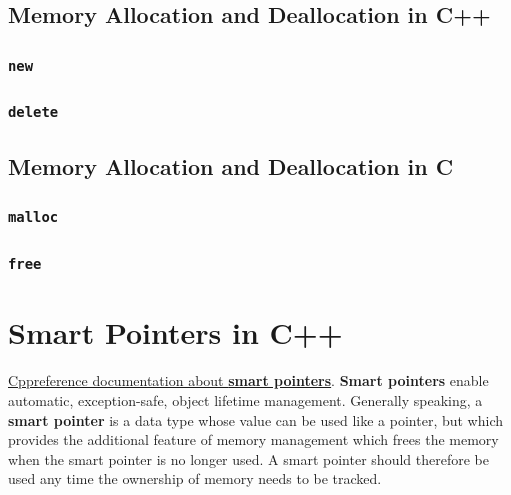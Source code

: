\subsection{Memory Allocation and Deallocation in C++}
\subsubsection{\texttt{new}}
\subsubsection{\texttt{delete}}

\subsection{Memory Allocation and Deallocation in C}
\subsubsection{\texttt{malloc}}
\subsubsection{\texttt{free}}

\section{Smart Pointers in C++}
\href{https://en.cppreference.com/w/cpp/memory}{Cppreference documentation about \textbf{smart pointers}}. 
\newline
\textbf{Smart pointers} enable automatic, exception-safe, object 
lifetime management.
\newline
Generally speaking, a \textbf{smart pointer} is a data type whose value 
can be used like a pointer, but which provides the additional feature of 
memory management which frees the memory when the smart pointer is 
no longer used. A smart pointer should therefore be used any time 
the ownership of memory needs to be tracked.

